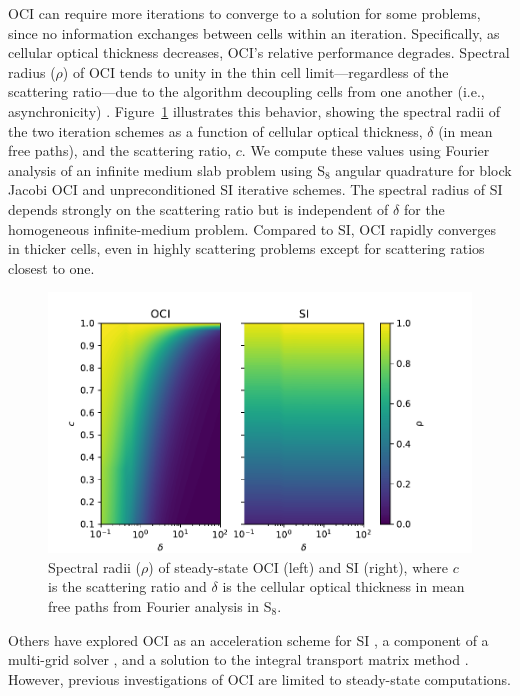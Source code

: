 OCI can require more iterations to converge to a solution for some problems, since no information exchanges between cells within an iteration.
Specifically, as cellular optical thickness decreases, OCI's relative performance degrades. %
Spectral radius ($\rho$) of OCI tends to unity in the thin cell limit---regardless of the scattering ratio---due to the algorithm decoupling cells from one another (i.e., asynchronicity) \cite{rosa_cellwise_2013, hoagland_hybrid_2021, man1994parallel}. 
Figure~\ref{fig:c2_ss-sepcrad} illustrates this behavior, showing the spectral radii of the two iteration schemes as a function of cellular optical thickness, $\delta$ (in mean free paths), and the scattering ratio, $c$.
We compute these values using Fourier analysis of an infinite medium slab problem using S$_{8}$ angular quadrature for block Jacobi OCI and unpreconditioned SI iterative schemes.
The spectral radius of SI depends strongly on the scattering ratio but is independent of $\delta$ for the homogeneous infinite-medium problem. 
Compared to SI, OCI rapidly converges in thicker cells, even in highly scattering problems except for scattering ratios closest to one.

\begin{figure}[htbp]
    \centering
    \includegraphics[width=\textwidth]{figures/therefore_figs/ss_specrads.pdf}
    \caption{Spectral radii (${\rho}$) of steady-state OCI (left) and SI (right), where $c$ is the scattering ratio and ${\delta}$ is the cellular optical thickness in mean free paths from Fourier analysis in S$_8$.}
    \label{fig:c2_ss-sepcrad}
\end{figure}

Others have explored OCI as an acceleration scheme for SI \cite{hoagland_hybrid_2021}, a component of a multi-grid solver \cite{man1995multigrid1, man1996multigrid2}, and a solution to the integral transport matrix method \cite{raffi2108pidotscom}.
However, previous investigations of OCI are limited to steady-state computations.

